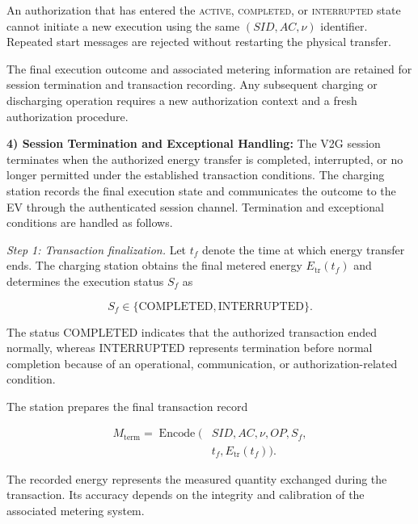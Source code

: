 \documentclass[twocolumn,10pt,journal]{IEEEtran}
\begin{document}
An authorization that has entered the
\textsc{active}, \textsc{completed}, or
\textsc{interrupted} state cannot initiate
a new execution using the same
$(SID,AC,\nu)$ identifier. Repeated start
messages are rejected without restarting
the physical transfer.

The final execution outcome and associated
metering information are retained for
session termination and transaction
recording. Any subsequent charging or
discharging operation requires a new
authorization context and a fresh
authorization procedure.

\noindent\textbf{4) Session Termination and Exceptional Handling:}
The V2G session terminates when the authorized energy
transfer is completed, interrupted, or no longer
permitted under the established transaction conditions.
The charging station records the final execution
state and communicates the outcome to the EV through
the authenticated session channel. Termination and
exceptional conditions are handled as follows.

\textit{Step 1: Transaction finalization.}
Let $t_f$ denote the time at which energy transfer
ends. The charging station obtains the final
metered energy $E_{\mathrm{tr}}(t_f)$ and determines
the execution status $S_f$ as

\begin{equation}
S_f\in
\{\mathrm{COMPLETED},\mathrm{INTERRUPTED}\}.
\label{eq:qsv2g_final_status}
\end{equation}

The status $\mathrm{COMPLETED}$ indicates that
the authorized transaction ended normally,
whereas $\mathrm{INTERRUPTED}$ represents
termination before normal completion because
of an operational, communication, or
authorization-related condition.

The station prepares the final transaction record

\begin{equation}
\begin{aligned}
M_{\mathrm{term}}=
\operatorname{Encode}\big(
&SID,AC,\nu,OP,S_f,\\
&t_f,E_{\mathrm{tr}}(t_f)
\big).
\end{aligned}
\label{eq:qsv2g_termination_record}
\end{equation}

The recorded energy represents the measured
quantity exchanged during the transaction.
Its accuracy depends on the integrity and
calibration of the associated metering system.
\end{document}
